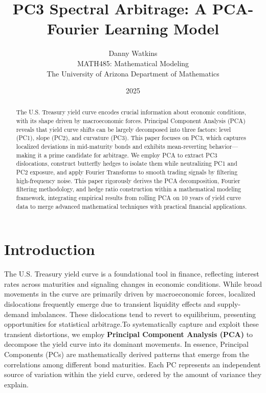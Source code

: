 \documentclass[12pt]{article}
\title{PC3 Spectral Arbitrage: A PCA-Fourier Learning Model\vspace{1em}}
\author{
    \small Danny Watkins \\ 
    \small MATH485: Mathematical Modeling \\ 
    \small The University of Arizona Department of Mathematics
}
\date{\small 2025}
\begin{document}
\maketitle

\begin{abstract}
\small
The U.S. Treasury yield curve encodes crucial information about economic conditions, with its shape driven by macroeconomic forces. Principal Component Analysis (PCA) reveals that yield curve shifts can be largely decomposed into three factors: level (PC1), slope (PC2), and curvature (PC3). This paper focuses on PC3, which captures localized deviations in mid-maturity bonds and exhibits mean-reverting behavior—making it a prime candidate for arbitrage. We employ PCA to extract PC3 dislocations, construct butterfly hedges to isolate them while neutralizing PC1 and PC2 exposure, and apply Fourier Transforms to smooth trading signals by filtering high-frequency noise. This paper rigorously derives the PCA decomposition, Fourier filtering methodology, and hedge ratio construction within a mathematical modeling framework, integrating empirical results from rolling PCA on 10 years of yield curve data to merge advanced mathematical techniques with practical financial applications.
\end{abstract}\vspace{1em}




\section{Introduction}

The U.S. Treasury yield curve is a foundational tool in finance, reflecting interest rates across maturities and signaling changes in economic conditions. While broad movements in the curve are primarily driven by macroeconomic forces, localized dislocations frequently emerge due to transient liquidity effects and supply-demand imbalances. These dislocations tend to revert to equilibrium, presenting opportunities for statistical arbitrage.To systematically capture and exploit these transient distortions, we employ \textbf{Principal Component Analysis (PCA)} to decompose the yield curve into its dominant movements. In essence, Principal Components (PCs) are mathematically derived patterns that emerge from the correlations among different bond maturities. Each PC represents an independent source of variation within the yield curve, ordered by the amount of variance they explain.\\
\end{document}
